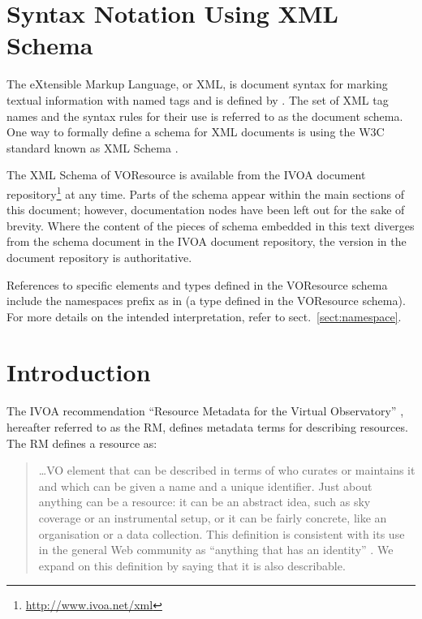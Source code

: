 \documentclass[11pt,a4paper]{ivoa}
\begin{document}
\section*{Syntax Notation Using XML Schema}

The eXtensible Markup Language, or XML, is document syntax for marking
textual information with named tags and is defined by \citet{std:XML}.
The set of XML tag names and the syntax
rules for their use is referred to as the document schema.  One way to
formally define a schema for XML documents is using the W3C standard
known as XML Schema \citep{std:XSD}.

The XML Schema of VOResource is
available from the IVOA document
repository\footnote{\url{http://www.ivoa.net/xml}} at any time.
Parts of the schema appear within the main sections of this document;
however, documentation nodes have been left out for the sake of brevity.
Where the content of the pieces of schema embedded in this text
diverges from the schema document in the IVOA document
repository, the version in the document repository is authoritative.

References to specific elements and types defined in the VOResource
schema include the namespaces prefix  as in
 (a type defined in the VOResource schema).  For more
details on the intended interpretation, refer to
sect.~\ref{sect:namespace}.

\section{Introduction}

The IVOA recommendation ``Resource Metadata for the Virtual
Observatory''
\citep{2007ivoa.spec.0302H}, hereafter referred to as the RM, defines
metadata terms for describing resources.  The RM defines a resource as: 

\begin{quotation}
\dots VO element that can be described in terms of who curates or
maintains it and which can be given a name and a unique identifier.
Just about anything can be a resource: it can be an abstract idea,
such as sky coverage or an instrumental setup, or it can be fairly
concrete, like an organisation or a data collection.  This definition
is consistent with its use in the general Web community as
``anything that has an identity'' \citep{std:RFC3986}.  We
expand on this definition by saying that it is also describable.  
\end{quotation}
\end{document}
